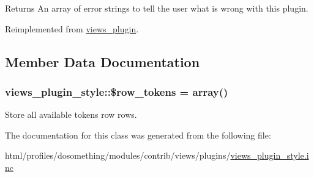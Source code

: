 \begin{DoxyReturn}{Returns}
An array of error strings to tell the user what is wrong with this plugin. 
\end{DoxyReturn}


Reimplemented from \hyperlink{classviews__plugin_aaf004b6a719837f08a1ffe4a1cf4d442}{views\_\-plugin}.

\subsection{Member Data Documentation}
\hypertarget{classviews__plugin__style_a037a508debefb5ea44fc50d34e863ffc}{
\subsubsection[{\$row\_\-tokens}]{\setlength{\rightskip}{0pt plus 5cm}views\_\-plugin\_\-style::\$row\_\-tokens = array()}}
\label{classviews__plugin__style_a037a508debefb5ea44fc50d34e863ffc}
Store all available tokens row rows. 

The documentation for this class was generated from the following file:\begin{DoxyCompactItemize}
\item 
html/profiles/dosomething/modules/contrib/views/plugins/\hyperlink{views__plugin__style_8inc}{views\_\-plugin\_\-style.inc}\end{DoxyCompactItemize}

